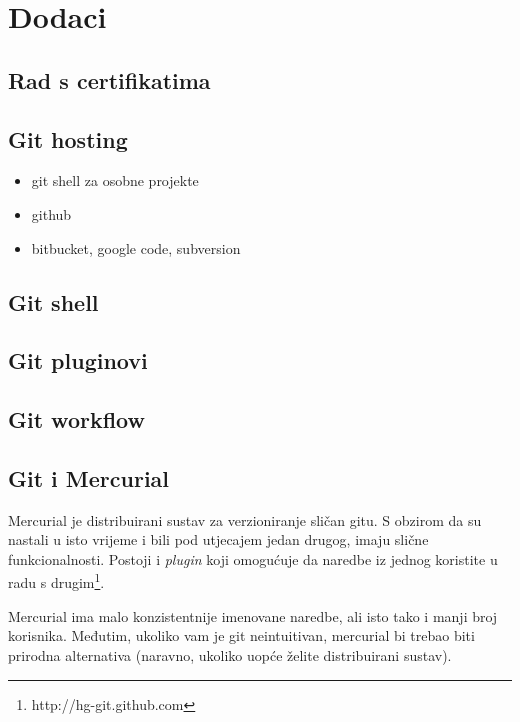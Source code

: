 \chapter*{Dodaci}

\section*{Rad s certifikatima}

\section*{Git hosting}

\begin{itemize}
   \item git shell za osobne projekte
   \item github
   \item bitbucket, google code, subversion
\end{itemize}

\section*{Git shell}

\section*{Git pluginovi}

\section*{Git workflow}

\section*{Git i Mercurial}

Mercurial je distribuirani sustav za verzioniranje sličan gitu.
S obzirom da su nastali u isto vrijeme i bili pod utjecajem jedan drugog, imaju slične funkcionalnosti.
Postoji i \emph{plugin} koji omogućuje da naredbe iz jednog koristite u radu s drugim\footnote{http://hg-git.github.com}.

Mercurial ima malo konzistentnije imenovane naredbe, ali isto tako i manji broj korisnika.
Međutim, ukoliko vam je git neintuitivan, mercurial bi trebao biti prirodna alternativa (naravno, ukoliko uopće želite distribuirani sustav).

